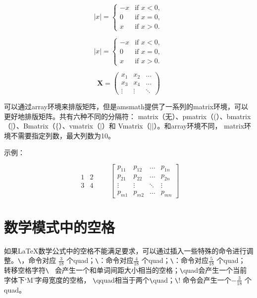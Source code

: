 \documentclass[UTF8]{ctexart}
\begin{document}
\begin{equation*}
  |x| = \left\{
     \begin{array}{rl}
        -x & \text{if } x < 0, \\
        0 & \text{if } x = 0, \\
        x & \text{if } x > 0.
     \end{array} \right.
\end{equation*}

\begin{equation*}
  |x| =
     \begin{cases}
        -x & \text{if } x < 0, \\
        0 & \text{if } x = 0, \\
        x & \text{if } x > 0.
     \end{cases}
\end{equation*}

\begin{equation*}
  \mathbf{X} =\left(
  \begin{array}{ccc}
    x_1 & x_2 & \ldots \\
    x_3 & x_4 & \ldots \\
    \vdots & \vdots & \ddots
  \end{array} \right)
\end{equation*}

可以通过array环境来排版矩阵，但是amsmath提供了一系列的matrix环境，可以更好地排版矩阵。共有六种不同的分隔符：
matrix（无）、pmatrix（(）、bmatrix（[）、Bmatrix（\{）、vmatrix（|）和 Vmatrix（||）。和array环境不同，
matrix环境不需要指定列数，最大列数为10。

示例：

\begin{equation*}
  \begin{matrix}
    1 & 2 \\
    3 & 4
  \end{matrix} \qquad
  \begin{bmatrix}
    p_{11} & p_{12} & \ldots
    & p_{1n} \\
    p_{21} & p_{22} & \ldots
    & p_{2n} \\
    \vdots & \vdots & \ddots
    & \vdots \\
    p_{m1} & p_{m2} & \ldots
    & p_{mn}
  \end{bmatrix}
\end{equation*}

\section{数学模式中的空格}
如果\LaTeX 数学公式中的空格不能满足要求，可以通过插入一些特殊的命令进行调整。\texttt{\textbackslash}，命令对应
$\frac{3}{18}$ 个quad；\texttt{\textbackslash}：命令对应$\frac{4}{18}$ 个quad；\texttt{\textbackslash}：命令对应$\frac{5}{18}$ 个quad；
转移空格字符\verb*|\ | 会产生一个和单词间距大小相当的空格；\texttt{\textbackslash}quad会产生一个当前字体下`M'字母宽度的空格，
\texttt{\textbackslash}qquad相当于两个\texttt{\textbackslash}quad；\texttt{\textbackslash}! 命令会产生一个$-\frac{3}{18}$ 个quad。
\end{document}
